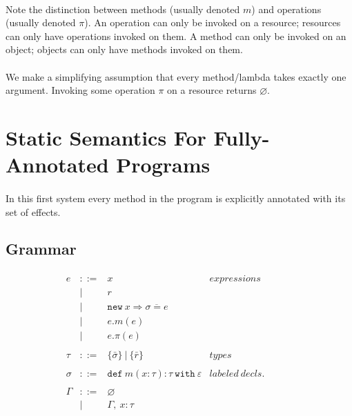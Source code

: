 \documentclass{llncs}
\newcommand{\keywadj}[1]{\mathtt{#1}}
\newcommand{\keyw}[1]{\keywadj{#1}~}
\begin{document}
\paragraph{}
Note the distinction between methods (usually denoted $m$) and operations (usually denoted $\pi$). An operation can only be invoked on a resource; resources can only have operations invoked on them. A method can only be invoked on an object; objects can only have methods invoked on them.

\paragraph{}
We make a simplifying assumption that every method/lambda takes exactly one argument. Invoking some operation $\pi$ on a resource returns $\varnothing$.



\newpage

\section{Static Semantics For Fully-Annotated Programs}

\paragraph{}
In this first system every method in the program is explicitly annotated with its set of effects.

\subsection{Grammar}

\[
\begin{array}{lll}
\begin{array}{lllr}

	e & ::= & x & expressions \\
  		& | & r \\
  		& | & \keywadj{new}~x \Rightarrow \overline{\sigma = e} \\
  		& | & e.m(e)\\
  		& | & e.\pi(e)\\
		&&\\

	\tau & ::= & \{ \bar \sigma \} ~ | ~ \{ \bar r \} & types \\
		&&\\

	\sigma & ::= &  \keyw{def} m(x:\tau):\tau~\keyw{with}\varepsilon  & labeled~ decls.\\
		&&\\
		
	\Gamma & ::= & \varnothing \\
		& | & \Gamma,~x : \tau\\
		&&\\

\end{array}
& ~~~~~~
&
\end{array}
\]
\end{document}
